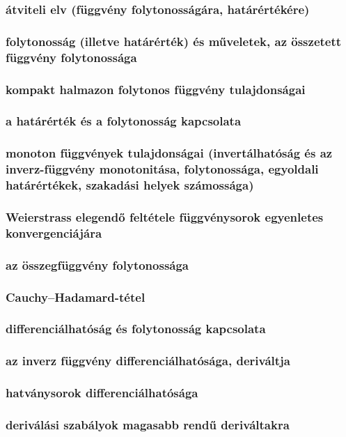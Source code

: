 \documentclass[12pt]{article}
\begin{document}
\subsubsection{átviteli elv (függvény folytonosságára, határértékére)}
\subsubsection{folytonosság (illetve határérték) és műveletek, az összetett függvény folytonossága}
\subsubsection{kompakt halmazon folytonos függvény tulajdonságai}
\subsubsection{a határérték és a folytonosság kapcsolata}
\subsubsection{monoton függvények tulajdonságai (invertálhatóság és az inverz-függvény monotonitása, folytonossága, egyoldali határértékek, szakadási helyek számossága)}
\subsubsection{Weierstrass elegendő feltétele függvénysorok egyenletes konvergenciájára}
\subsubsection{az összegfüggvény folytonossága}
\subsubsection{Cauchy–Hadamard-tétel}
\subsubsection{differenciálhatóság és folytonosság kapcsolata}
\subsubsection{az inverz függvény differenciálhatósága, deriváltja}
\subsubsection{hatványsorok differenciálhatósága}
\subsubsection{deriválási szabályok magasabb rendű deriváltakra}
\end{document}
